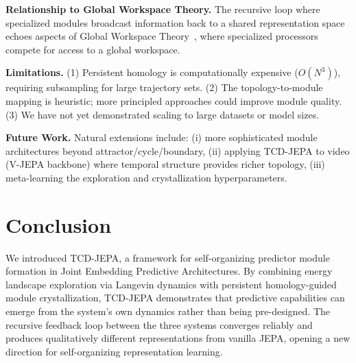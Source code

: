 \documentclass[10pt,twocolumn]{article}
\begin{document}
\textbf{Relationship to Global Workspace Theory.} The recursive loop where specialized modules broadcast information back to a shared representation space echoes aspects of Global Workspace Theory~\citep{baars2005global}, where specialized processors compete for access to a global workspace.

\textbf{Limitations.} (1) Persistent homology is computationally expensive ($O(N^3)$), requiring subsampling for large trajectory sets. (2) The topology-to-module mapping is heuristic; more principled approaches could improve module quality. (3) We have not yet demonstrated scaling to large datasets or model sizes.

\textbf{Future Work.} Natural extensions include: (i) more sophisticated module architectures beyond attractor/cycle/boundary, (ii) applying TCD-JEPA to video (V-JEPA backbone) where temporal structure provides richer topology, (iii) meta-learning the exploration and crystallization hyperparameters.

\section{Conclusion}

We introduced TCD-JEPA, a framework for self-organizing predictor module formation in Joint Embedding Predictive Architectures. By combining energy landscape exploration via Langevin dynamics with persistent homology-guided module crystallization, TCD-JEPA demonstrates that predictive capabilities can emerge from the system's own dynamics rather than being pre-designed. The recursive feedback loop between the three systems converges reliably and produces qualitatively different representations from vanilla JEPA, opening a new direction for self-organizing representation learning.
\end{document}
